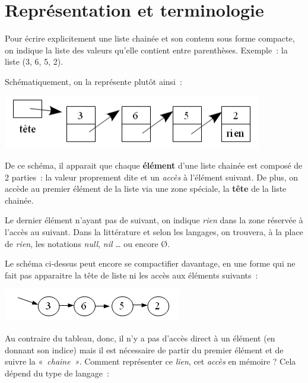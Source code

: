 \section{Représentation et terminologie}

	Pour écrire explicitement une liste chainée et son contenu 
	sous forme compacte, on indique la liste des valeurs qu'elle
	contient entre parenthèses. Exemple~: la liste (3, 6, 5, 2).
	
	Schématiquement, on la représente plutôt ainsi~:

	\begin{center}
	\includegraphics[width=11.324cm,height=2.355cm]{image/a2012Logique2eme-img002.png}
	\end{center}
	
	De ce schéma, il apparait que chaque \textbf{élément} 
	d'une liste chainée est composé de 2 parties~: la valeur
	proprement dite et un \textit{accès} à l'élément suivant. 
	De plus, on accède au premier élément de la liste via une
	zone spéciale, la \textbf{tête} de la liste chainée.

	Le dernier élément n'ayant pas de suivant, on indique \textit{rien} 
	dans la zone réservée à l'accès au suivant. Dans la
	littérature et selon les langages, on trouvera, à la place de \textit{rien}, 
	les notations \textit{null}, \textit{nil} {\dots} ou encore Ø.
	
	Le schéma ci-dessus peut encore se compactifier davantage, 
	en une forme qui ne fait pas apparaitre la tête de liste ni
	les accès aux éléments suivants~:

	\begin{center}
	\includegraphics[width=7.779cm,height=1.429cm]{image/a2012Logique2eme-img003.png}
	\end{center}
	
	Au contraire du tableau, donc, il n'y a pas d'accès direct à un élément 
	(en donnant son indice) mais il est nécessaire
	de partir du premier élément et de suivre la «~\textit{chaine~»}. 
	Comment représenter ce \textit{lien}, cet
	\textit{accès} en mémoire ? Cela dépend du type de langage~:

